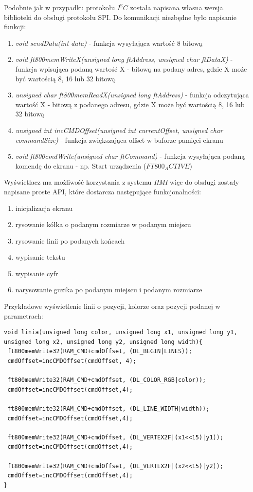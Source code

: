 \documentclass{xmgr}
\begin{document}
Podobnie jak w przypadku protokołu $I^2C$ została napisana własna wersja biblioteki do obsługi protokołu SPI. Do komunikacji niezbędne było napisanie funkcji:
\begin{enumerate}
	\item \emph{void sendData(int data)} - funkcja wysyłająca wartość 8 bitową
	\item \emph{void ft800memWriteX(unsigned long ftAddress, unsigned char ftDataX)} - funkcja wpisująca podaną wartość X - bitową na podany adres, gdzie X może być wartością 8, 16 lub 32 bitową
	\item \emph{unsigned char ft800memReadX(unsigned long ftAddress)} - funkcja odczytująca wartość X - bitową z podanego adresu, gdzie X może być wartością 8, 16 lub 32 bitową
	\item \emph{unsigned int incCMDOffset(unsigned int currentOffset, unsigned char commandSize)} - funkcja zwiększająca offset w buforze pamięci ekranu
	\item \emph{void ft800cmdWrite(unsigned char ftCommand)} - funkcja wysyłająca podaną komendę do ekranu - np. Start urządzenia ($FT800_ACTIVE$)
\end{enumerate}

Wyświetlacz ma możliwość korzystania z systemu \emph{HMI} więc do obsługi zostały napisane proste API, które dostarcza następujące funkcjonalności:
 \begin{enumerate}
	\item inicjalizacja ekranu
	\item rysowanie kółka o podanym rozmiarze w podanym miejscu
	\item rysowanie linii po podanych końcach
	\item wypisanie tekstu
	\item wypisanie cyfr
	\item narysowanie guzika po podanym miejscu i podanym rozmiarze
\end{enumerate}

Przykładowe wyświetlenie linii o pozycji, kolorze oraz pozycji podanej w parametrach:
\begin{lstlisting}[label=bot-dirs-alg,caption=Narysowanie linii na ekranie]
void linia(unsigned long color, unsigned long x1, unsigned long y1, 
unsigned long x2, unsigned long y2, unsigned long width){
 ft800memWrite32(RAM_CMD+cmdOffset, (DL_BEGIN|LINES));
 cmdOffset=incCMDOffset(cmdOffset, 4);
 
 ft800memWrite32(RAM_CMD+cmdOffset, (DL_COLOR_RGB|color));
 cmdOffset=incCMDOffset(cmdOffset,4);

 ft800memWrite32(RAM_CMD+cmdOffset, (DL_LINE_WIDTH|width));
 cmdOffset=incCMDOffset(cmdOffset,4);

 ft800memWrite32(RAM_CMD+cmdOffset, (DL_VERTEX2F|(x1<<15)|y1));
 cmdOffset=incCMDOffset(cmdOffset,4);
  
 ft800memWrite32(RAM_CMD+cmdOffset, (DL_VERTEX2F|(x2<<15)|y2));
 cmdOffset=incCMDOffset(cmdOffset,4);	
}
\end{lstlisting}
\end{document}
